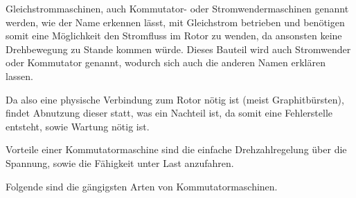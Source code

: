 Gleichstrommaschinen, auch Kommutator- oder Stromwendermaschinen genannt werden, wie der Name erkennen lässt, mit Gleichstrom betrieben und benötigen somit eine Möglichkeit den Stromfluss im Rotor zu wenden, da ansonsten keine Drehbewegung zu Stande kommen würde. 
Dieses Bauteil wird auch Stromwender oder Kommutator genannt, wodurch sich auch die anderen Namen erklären lassen.

Da also eine physische Verbindung zum Rotor nötig ist (meist Graphitbürsten), findet Abnutzung dieser statt, was ein Nachteil ist, da somit eine Fehlerstelle entsteht, sowie Wartung nötig ist.

Vorteile einer Kommutatormaschine sind die einfache Drehzahlregelung über die Spannung, sowie die Fähigkeit unter Last anzufahren.

Folgende sind die gängigsten Arten von Kommutatormaschinen.